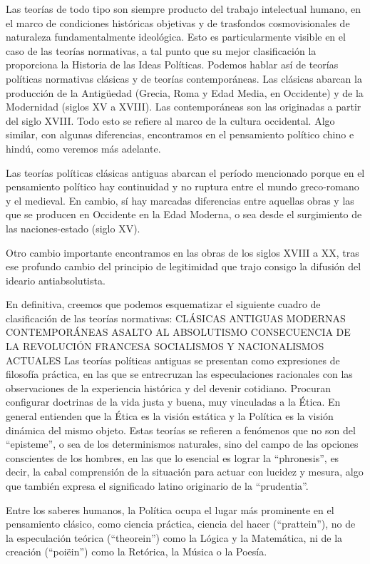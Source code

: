 \documentclass[
]{book}
\begin{document}
Las teorías de todo tipo son siempre producto del trabajo intelectual humano, en el marco de condiciones históricas objetivas y de trasfondos cosmovisionales de naturaleza fundamentalmente ideológica. Esto es particularmente visible en el caso de las teorías normativas, a tal punto que su mejor clasificación la proporciona la Historia de las Ideas Políticas. Podemos hablar así de teorías políticas normativas clásicas y de teorías contemporáneas. Las clásicas abarcan la producción de la Antigüedad (Grecia, Roma y Edad Media, en Occidente) y de la Modernidad (siglos XV a XVIII). Las contemporáneas son las originadas a partir del siglo XVIII. Todo esto se refiere al marco de la cultura occidental. Algo similar, con algunas diferencias, encontramos en el pensamiento político chino e hindú, como veremos más adelante.

Las teorías políticas clásicas antiguas abarcan el período mencionado porque en el pensamiento político hay continuidad y no ruptura entre el mundo greco-romano y el medieval. En cambio, sí hay marcadas diferencias entre aquellas obras y las que se producen en Occidente en la Edad Moderna, o sea desde el surgimiento de las naciones-estado (siglo XV).

Otro cambio importante encontramos en las obras de los siglos XVIII a XX, tras ese profundo cambio del principio de legitimidad que trajo consigo la difusión del ideario antiabsolutista.

En definitiva, creemos que podemos esquematizar el siguiente cuadro de clasificación de las teorías normativas: CLÁSICAS ANTIGUAS MODERNAS CONTEMPORÁNEAS ASALTO AL ABSOLUTISMO CONSECUENCIA DE LA REVOLUCIÓN FRANCESA SOCIALISMOS Y NACIONALISMOS ACTUALES Las teorías políticas antiguas se presentan como expresiones de filosofía práctica, en las que se entrecruzan las especulaciones racionales con las observaciones de la experiencia histórica y del devenir cotidiano. Procuran configurar doctrinas de la vida justa y buena, muy vinculadas a la Ética. En general entienden que la Ética es la visión estática y la Política es la visión dinámica del mismo objeto. Estas teorías se refieren a fenómenos que no son del ``episteme'', o sea de los determinismos naturales, sino del campo de las opciones conscientes de los hombres, en las que lo esencial es lograr la ``phronesis'', es decir, la cabal comprensión de la situación para actuar con lucidez y mesura, algo que también expresa el significado latino originario de la ``prudentia''.

Entre los saberes humanos, la Política ocupa el lugar más prominente en el pensamiento clásico, como ciencia práctica, ciencia del hacer (``prattein''), no de la especulación teórica (``theorein'') como la Lógica y la Matemática, ni de la creación (``poiëin'') como la Retórica, la Música o la Poesía.
\end{document}

